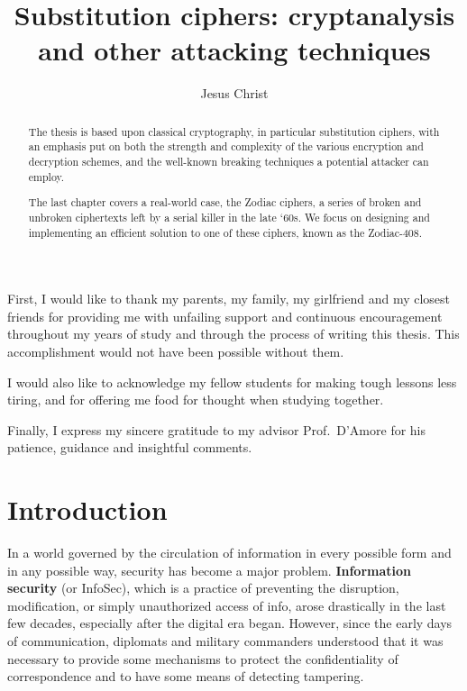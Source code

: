 \documentclass[Lau,binding=0.6cm,oneside]{sapthesis}
\title{Substitution ciphers: cryptanalysis \\and other attacking techniques}
\author{Jesus Christ}
\begin{document}
\frontmatter

\maketitle

\dedication{Dedicated to\\Alan Turing}

\begin{abstract}

The thesis is based upon classical cryptography, in particular substitution ciphers, with an emphasis put on both the strength and complexity of the various encryption and decryption schemes, and the well-known breaking techniques a potential attacker can employ.

The last chapter covers a real-world case, the Zodiac ciphers, a series of broken and unbroken ciphertexts left by a serial killer in the late `60s. We focus on designing and implementing an efficient solution to one of these ciphers, known as the \textsf{Zodiac-408}.

\end{abstract}

\begin{acknowledgments}

First, I would like to thank my parents, my family, my girlfriend and my closest friends for providing me with unfailing support and continuous encouragement throughout my years of study and through the process of writing this thesis. This accomplishment would not have been possible without them.

I would also like to acknowledge my fellow students for making tough lessons less tiring, and for offering me food for thought when studying together.

Finally, I express my sincere gratitude to my advisor Prof.\ D'Amore for his patience, guidance and insightful comments.
\end{acknowledgments}

\tableofcontents

\mainmatter

\chapter{Introduction}
In a world governed by the circulation of information in every possible form and in any possible way, security has become a major problem. \textbf{Information security} (or InfoSec), which is a practice of preventing the disruption, modification, or simply unauthorized access of info, arose drastically in the last few decades, especially after the digital era began. However, since the early days of communication, diplomats and military commanders understood that it was necessary to provide some mechanisms to protect the confidentiality of correspondence and to have some means of detecting tampering.
\end{document}
